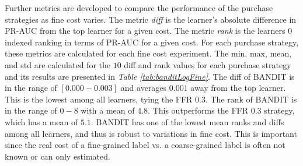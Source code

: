 \documentclass[ms]{nuthesis}
\begin{document}
Further metrics are developed to compare the performance of the purchase strategies
as fine cost varies. The metric \textit{diff} is the learner's absolute difference
 in PR-AUC from the top learner for a given cost. The metric \textit{rank} is the learners
 $0$ indexed ranking in terms of PR-AUC for a given cost. For each purchase strategy,
 these metrics are calculated for each fine cost experiment. The min, max,
 mean, and std are calculated for the $10$ diff and rank values for each purchase strategy
 and its results are presented in \textit{Table \ref{tab:banditLogFine}}. The diff of BANDIT
 is in the range of $[0.000-0.003]$ and averages $0.001$ away from the top learner. This is the
 lowest among all learners, tying the FFR $0.3$. The rank of BANDIT is in the range of $0-8$ with
 a mean of $4.8$. This outperforms the FFR $0.3$ strategy, which has a mean of $5.1$. BANDIT has
 one of the lowest mean ranks and diffs among all learners, and thus is robust to variations in fine
 cost. This is important since the real cost of a fine-grained label vs. a coarse-grained label is
 often not known or can only estimated.

\begin{table}[H]
\caption{Aggregated PR AUC for the protein dataset}
\centering
{}
\label{tab:banditLogFine}
\end{table}
\end{document}

